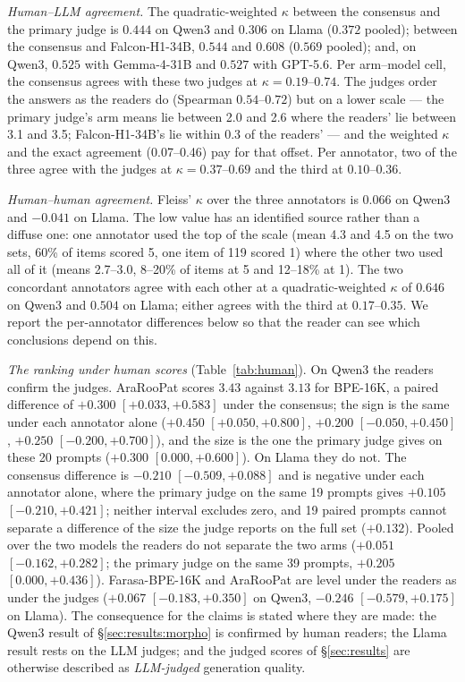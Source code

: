 \documentclass[a4paper,fleqn]{cas-sc}
\begin{document}
\emph{Human--LLM agreement.} The quadratic-weighted $\kappa$ between the consensus and the primary judge is $0.444$ on Qwen3 and $0.306$ on Llama ($0.372$ pooled); between the consensus and Falcon-H1-34B, $0.544$ and $0.608$ ($0.569$ pooled); and, on Qwen3, $0.525$ with Gemma-4-31B and $0.527$ with GPT-5.6. Per arm--model cell, the consensus agrees with these two judges at $\kappa = 0.19$--$0.74$. The judges order the answers as the readers do (Spearman $0.54$--$0.72$) but on a lower scale --- the primary judge's arm means lie between 2.0 and 2.6 where the readers' lie between 3.1 and 3.5; Falcon-H1-34B's lie within 0.3 of the readers' --- and the weighted $\kappa$ and the exact agreement (0.07--0.46) pay for that offset. Per annotator, two of the three agree with the judges at $\kappa = 0.37$--$0.69$ and the third at $0.10$--$0.36$.

\emph{Human--human agreement.} Fleiss' $\kappa$ over the three annotators is $0.066$ on Qwen3 and $-0.041$ on Llama. The low value has an identified source rather than a diffuse one: one annotator used the top of the scale (mean 4.3 and 4.5 on the two sets, 60\% of items scored 5, one item of 119 scored 1) where the other two used all of it (means 2.7--3.0, 8--20\% of items at 5 and 12--18\% at 1). The two concordant annotators agree with each other at a quadratic-weighted $\kappa$ of $0.646$ on Qwen3 and $0.504$ on Llama; either agrees with the third at $0.17$--$0.35$. We report the per-annotator differences below so that the reader can see which conclusions depend on this.

\emph{The ranking under human scores} (Table~\ref{tab:human}). On Qwen3 the readers confirm the judges. AraRooPat scores $3.43$ against $3.13$ for BPE-16K, a paired difference of $+0.300$ $[+0.033,+0.583]$ under the consensus; the sign is the same under each annotator alone ($+0.450$ $[+0.050,+0.800]$, $+0.200$ $[-0.050,+0.450]$, $+0.250$ $[-0.200,+0.700]$), and the size is the one the primary judge gives on these 20 prompts ($+0.300$ $[0.000,+0.600]$). On Llama they do not. The consensus difference is $-0.210$ $[-0.509,+0.088]$ and is negative under each annotator alone, where the primary judge on the same 19 prompts gives $+0.105$ $[-0.210,+0.421]$; neither interval excludes zero, and 19 paired prompts cannot separate a difference of the size the judge reports on the full set ($+0.132$). Pooled over the two models the readers do not separate the two arms ($+0.051$ $[-0.162,+0.282]$; the primary judge on the same 39 prompts, $+0.205$ $[0.000,+0.436]$). Farasa-BPE-16K and AraRooPat are level under the readers as under the judges ($+0.067$ $[-0.183,+0.350]$ on Qwen3, $-0.246$ $[-0.579,+0.175]$ on Llama). The consequence for the claims is stated where they are made: the Qwen3 result of \S\ref{sec:results:morpho} is confirmed by human readers; the Llama result rests on the LLM judges; and the judged scores of \S\ref{sec:results} are otherwise described as \emph{LLM-judged} generation quality.
\end{document}
